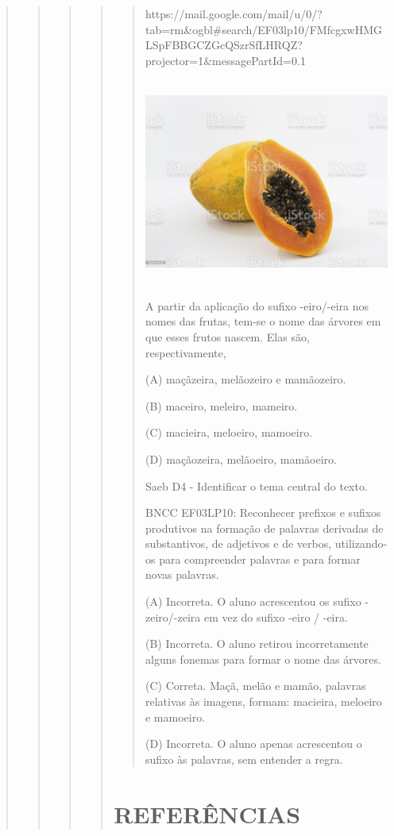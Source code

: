 \begin{quote}
\begin{quote}
\begin{quote}
\begin{quote}
\begin{quote}
https://mail.google.com/mail/u/0/?tab=rm\&ogbl\#search/EF03lp10/FMfcgxwHMGLSpFBBGCZGcQSzrSfLHRQZ?projector=1\&messagePartId=0.1

\includegraphics[width=3.76501in,height=2.67500in]{media/image40.jpeg}

A partir da aplicação do sufixo -eiro/-eira nos nomes das frutas, tem-se
o nome das árvores em que esses frutos nascem. Elas são,
respectivamente,

(A) maçãzeira, melãozeiro e mamãozeiro.

(B) maceiro, meleiro, mameiro.

(C) macieira, meloeiro, mamoeiro.

(D) maçãozeira, melãoeiro, mamãoeiro.

Saeb D4 - Identificar o tema central do texto.

BNCC EF03LP10: Reconhecer prefixos e sufixos produtivos na formação de
palavras derivadas de substantivos, de adjetivos e de verbos,
utilizando-os para compreender palavras e para formar novas palavras.

(A) Incorreta. O aluno acrescentou os sufixo -zeiro/-zeira em vez do
sufixo -eiro / -eira.

(B) Incorreta. O aluno retirou incorretamente alguns fonemas para formar
o nome das árvores.

(C) Correta. Maçã, melão e mamão, palavras relativas às imagens, formam:
macieira, meloeiro e mamoeiro.

(D) Incorreta. O aluno apenas acrescentou o sufixo às palavras, sem
entender a regra.
\end{quote}

\section{REFERÊNCIAS}\label{referuxeancias}


\end{quote}
\end{quote}
\end{quote}
\end{quote}
